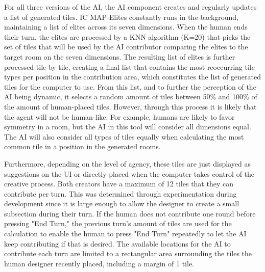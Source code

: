 For all three versions of the AI, the AI component creates and regularly updates a list of generated tiles. IC MAP-Elites constantly runs in the background, maintaining a list of elites across its seven dimensions. When the human ends their turn, the elites are processed by a KNN algorithm (K=20) that picks the set of tiles that will be used by the AI contributor comparing the elites to the target room on the seven dimensions. The resulting list of elites is further processed tile by tile, creating a final list that contains the most reoccurring tile types per position in the contribution area, which constitutes the list of generated tiles for the computer to use. From this list, and to further the perception of the AI being dynamic, it selects a random amount of tiles between 50\% and 100\% of the amount of human-placed tiles. However, through this process it is likely that the agent will not be human-like. For example, humans are likely to favor symmetry in a room, but the AI in this tool will consider all dimensions equal. The AI will also consider all types of tiles equally when calculating the most common tile in a position in the generated rooms.



Furthermore, depending on the level of agency, these tiles are just displayed as suggestions on the UI or directly placed when the computer takes control of the creative process. Both creators have a maximum of 12 tiles that they can contribute per turn. This was determined through experimentation during development since it is large enough to allow the designer to create a small subsection during their turn. If the human does not contribute one round before pressing "End Turn," the previous turn's amount of tiles are used for the calculation to enable the human to press "End Turn" repeatedly to let the AI keep contributing if that is desired. The available locations for the AI to contribute each turn are limited to a rectangular area surrounding the tiles the human designer recently placed, including a margin of 1 tile.




